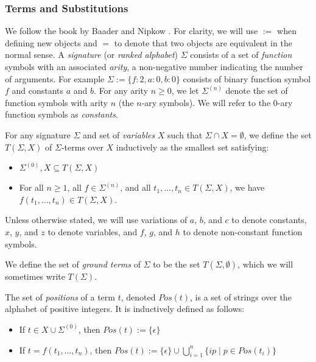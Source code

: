 
\subsubsection*{Terms and Substitutions}
We follow the book by Baader and Nipkow \citep{baader1999term}. 
For clarity, we will use $:=$ when defining new objects and $=$ to denote that two objects are equivalent in the normal sense.  
A \emph{signature} (or \emph{ranked alphabet}) $\Sigma$ consists of a set of \emph{function} symbols with an associated \emph{arity}, a
non-negative number indicating the number of arguments.  
For example $\Sigma := \{ f:2, a:0, b:0\}$ consists of binary function symbol $f$ and constants $a$ and $b$.
For any arity $n \ge 0$, we let $\Sigma^{(n)}$ denote the set of function symbols with arity $n$ (the $n$-ary symbols). 
We will refer to the $0$-ary function symbols as \emph{constants}. 

For any signature $\Sigma$ and set of \emph{variables} $X$ such that $\Sigma \cap X = \emptyset$, we define the set $T(\Sigma, X)$ of $\Sigma$-terms over $X$ inductively as the smallest set satisfying: 
\begin{itemize}
\item $\Sigma^{(0)},X \subseteq T(\Sigma, X)$
\item  For all $n \ge 1$, all $f \in \Sigma^{(n)}$, and all $t_1, \dots, t_n \in T(\Sigma, X)$, we have $f(t_1,\dots,t_n) \in  T(\Sigma, X)$.
\end{itemize} 

Unless otherwise stated, we will use variations of $a$, $b$, and $c$ to denote constants, $x$, $y$, and $z$ to denote variables, and $f$, $g$, and $h$ to denote non-constant function symbols.

We define the set of \emph{ground terms} of $\Sigma$ to be the set $T(\Sigma, \emptyset)$, which we will sometimes write $T(\Sigma)$.

The set of \emph{positions} of a term $t$, denoted $Pos(t)$, is a set of strings over the alphabet of positive integers. 
It is inductively defined as follows:
\begin{itemize}
\item If $t \in X \cup \Sigma^{(0)}$, then $Pos(t) := \{ \epsilon \}$
\item If $t = f(t_1, \dots, t_n)$, then $Pos(t) := \{\epsilon\}  \cup \bigcup_{i=1}^{n} \{ip \mid p \in Pos(t_i) \}$ 
\end{itemize}

